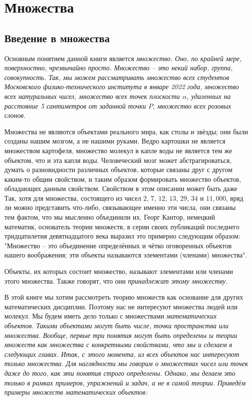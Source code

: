 \documentclass[a4paper, 12pt]{extreport}
\begin{document}
\chapter{Множества}

\section{Введение в множества}

Основным понятием данной книги является \itshape множество\normalfont{}. Оно, по крайней мере, поверхностно, чрезвычайно просто. Множество -- это некий набор, группа, совокупность. Так, мы можем рассматривать множество всех студентов Московского физико-технического института в январе 2022 года, множество всех натуральных чисел, множество всех точек плоскости $\alpha$, удаленных на расстояние 5 сантиметров от заданной точки $P$, множество всех розовых слонов. \par
Множества не являются объектами реального мира, как столы и звёзды; они были созданы нашим мозгом, а не нашими руками. Ведро картошки не является множеством картофеля, множество молекул в капле воды не является тем же объектом, что и эта капля воды. Человеческий мозг может абстрагироваться, думать о разновидности различных объектов, которые связаны друг с другом каким-то общим свойством, и таким образом формировать множество объектов, обладающих данным свойством. Свойством в этом описании может быть даже  Так, хотя для множества, состоящего из чисел $2$, $7$, $12$, $13$, $29$, $34$ и $11,000$, вряд ли можно представить что-либо, связывающее именно эти числа, они связаны тем фактом, что мы мысленно объединили их. Георг Кантор, немецкий математик, основатель теории множеств, в серии своих публикаций последнего тридцатилетия девятнадцатого века выразил это примерно следующим образом: "Множество -- это объединение определённых и чётко оговоренных объектов нашего воображения; эти объекты называются элементами (членами) множества". \par
Объекты, их которых состоит множество, называют элементами или членами этого множества. Также говорят, что они \itshape принадлежат\normalfont{} этому множеству. \par
В этой книге мы хотим рассмотреть теорию множеств как основание для других математических дисциплин. Поэтому нас не интересуют множества людей или молекул. Мы будем иметь дело только с множествами \itshape математических\normalfont{} объектов. Такими объектами могут быть числе, точки пространства или множества. Вообще, первые три понятия могут быть определены ы теории множеств как множества с конкретными свойствами, что мы и сделаем в следующих главах. Итак, с этого момента, из всех объектов нас интересуют только множества. Для наглядности мы говорим о множествах чисел или точек даже до того, как эти понятия строго определены. Однако, мы делаем это только в рамках примеров, упражнений и задач, а не в самой теории. Приведём примеры множеств математических объектов: \par
\end{document}
